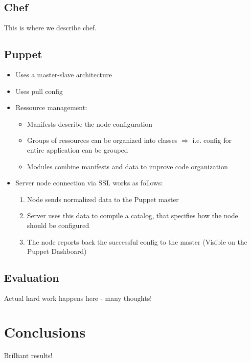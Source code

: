 \subsection{Chef}

This is where we describe chef.

\subsection{Puppet}
	\begin{itemize}
		\item Uses a master-slave architecture
		\item Uses pull config
		\item Ressource management:
		\begin{itemize}
			\item Manifests describe the node configuration
			\item Groups of ressources can be organized into classes $\Rightarrow$ i.e. config for entire application can be grouped
			\item Modules combine manifests and data to improve code organization
		\end{itemize}
		\item Server node connection via SSL works as follows:
		\begin{enumerate}
			\item Node sends normalized data to the Puppet master
			\item Server uses this data to compile a catalog, that specifies how the node should be configured
			\item The node reports back the successful config to the master (Visible on the Puppet Dashboard)
		\end{enumerate}
	\end{itemize}

\subsection{Evaluation}

Actual hard work happens here - many thoughts!


\section{Conclusions}

Brilliant results!

